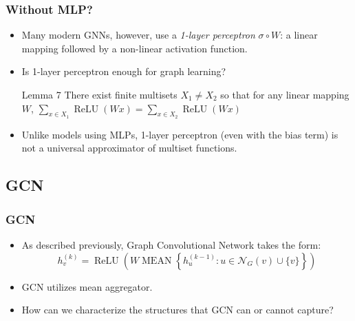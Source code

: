\documentclass{beamer}
\DeclareMathOperator{\MEAN}{MEAN}
\DeclareMathOperator{\relu}{ReLU}
\begin{document}
\begin{frame}
\frametitle{Without MLP?}

\begin{itemize}
	\item Many modern GNNs, however, use a {\it 1-layer perceptron} $\sigma \circ W$: a linear mapping followed by a non-linear activation function. \pause
	
	\item Is 1-layer perceptron enough for graph learning? \pause

\begin{block}{Lemma 7}
There exist finite multisets $X_1 \not= X_2$ so that for any linear mapping $W$, $\sum_{x \in X_1} \relu(Wx) = \sum_{x \in X_2} \relu(Wx)$
\end{block} \pause

	\item Unlike models using MLPs, 1-layer perceptron (even with the bias term) is \alert{not a universal approximator of multiset functions}.
	
\end{itemize}

\end{frame}


\subsection{GCN}

\begin{frame}
\frametitle{GCN}

\begin{itemize}
	\item As described previously, Graph Convolutional Network takes the form:
	$$h_v^{(k)} = \relu \left( W \MEAN \left\{ h_u^{(k - 1)} : u \in \mathcal{N}_G(v) \cup \{v\} \right\} \right)$$ \pause
	
	\item GCN utilizes mean aggregator. \pause
	
	\item How can we characterize the structures that GCN can or cannot capture?
\end{itemize}

\end{frame}
\end{document}
